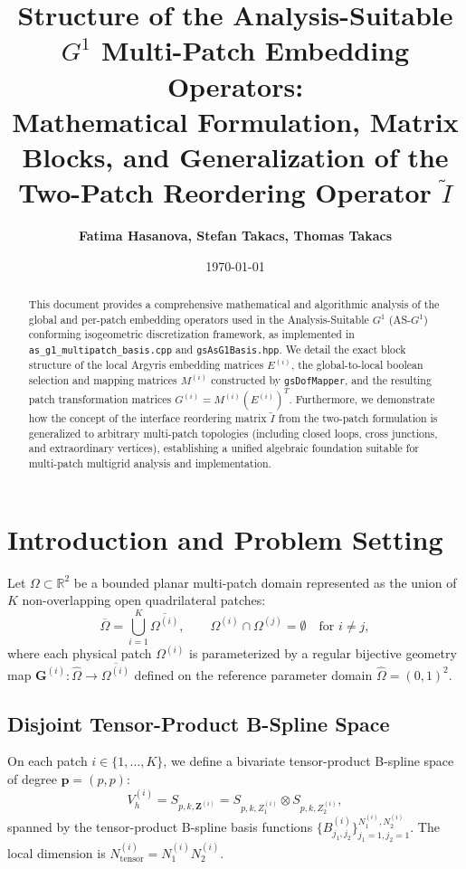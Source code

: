 \documentclass[11pt,a4paper]{article}
\title{\textbf{Structure of the Analysis-Suitable $G^1$ Multi-Patch Embedding Operators:\\
Mathematical Formulation, Matrix Blocks, and Generalization of the Two-Patch Reordering Operator \texorpdfstring{$\widetilde{I}$}{I-tilde}}}
\author{\textbf{Fatima Hasanova, Stefan Takacs, Thomas Takacs}}
\date{\today}
\newcommand{\R}{\mathbb{R}}
\begin{document}
\maketitle

\begin{abstract}
This document provides a comprehensive mathematical and algorithmic analysis of the global and per-patch embedding operators used in the Analysis-Suitable $G^1$ (AS-$G^1$) conforming isogeometric discretization framework, as implemented in \texttt{as\_g1\_multipatch\_basis.cpp} and \texttt{gsAsG1Basis.hpp}. We detail the exact block structure of the local Argyris embedding matrices $E^{(i)}$, the global-to-local boolean selection and mapping matrices $M^{(i)}$ constructed by \texttt{gsDofMapper}, and the resulting patch transformation matrices $G^{(i)} = M^{(i)} (E^{(i)})^T$. Furthermore, we demonstrate how the concept of the interface reordering matrix $\widetilde{I}$ from the two-patch formulation is generalized to arbitrary multi-patch topologies (including closed loops, cross junctions, and extraordinary vertices), establishing a unified algebraic foundation suitable for multi-patch multigrid analysis and implementation.
\end{abstract}

\tableofcontents
\newpage

\section{Introduction and Problem Setting}

Let $\Omega \subset \R^2$ be a bounded planar multi-patch domain represented as the union of $K$ non-overlapping open quadrilateral patches:
\begin{equation}
    \overline{\Omega} = \bigcup_{i=1}^K \overline{\Omega^{(i)}}, \qquad \Omega^{(i)} \cap \Omega^{(j)} = \emptyset \quad \text{for } i \ne j,
\end{equation}
where each physical patch $\Omega^{(i)}$ is parameterized by a regular bijective geometry map $\mathbf{G}^{(i)}: \widehat{\Omega} \to \overline{\Omega^{(i)}}$ defined on the reference parameter domain $\widehat{\Omega} = (0,1)^2$.

\subsection{Disjoint Tensor-Product B-Spline Space}
On each patch $i \in \{1, \dots, K\}$, we define a bivariate tensor-product B-spline space of degree $\mathbf{p} = (p, p)$:
\begin{equation}
    V_h^{(i)} = S_{p, k, \mathbf{Z}^{(i)}} = S_{p, k, Z_1^{(i)}} \otimes S_{p, k, Z_2^{(i)}},
\end{equation}
spanned by the tensor-product B-spline basis functions $\{ B_{j_1, j_2}^{(i)} \}_{j_1=1, j_2=1}^{N_1^{(i)}, N_2^{(i)}}$. The local dimension is $N_{\text{tensor}}^{(i)} = N_1^{(i)} N_2^{(i)}$.
\end{document}
